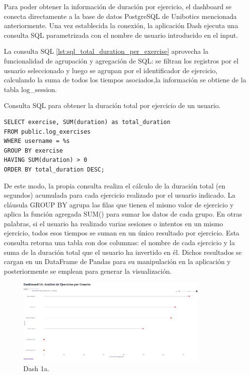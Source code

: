 \documentclass[a4paper, 12pt]{book}
\begin{document}
Para poder obtener la información de duración por ejercicio, el dashboard se conecta directamente a la base de datos PostgreSQL de Unibotics mencionada anteriormente.
Una vez establecida la conexión, la aplicación Dash ejecuta una consulta SQL parametrizada con el nombre de usuario introducido en el input.

La consulta SQL \ref{lst:sql_total_duration_per_exercise} aprovecha la funcionalidad de agrupación y agregación de SQL: se filtran los registros por el usuario seleccionado y luego se agrupan por el identificador de ejercicio, calculando la suma de todos los tiempos asociados,la información se obtiene de la tabla log\_session.

\begin{listing}[h!]
    \caption{Consulta SQL para obtener la duración total por ejercicio de un usuario.}{}
    \label{lst:sql_total_duration_per_exercise}
    \begin{verbatim}
SELECT exercise, SUM(duration) as total_duration
FROM public.log_exercises
WHERE username = %s
GROUP BY exercise
HAVING SUM(duration) > 0  
ORDER BY total_duration DESC;
    \end{verbatim}
\end{listing}


De este modo, la propia consulta realiza el cálculo de la duración total (en segundos) acumulada para cada ejercicio realizado por el usuario indicado. La cláusula GROUP BY agrupa las filas que tienen el mismo valor de ejercicio y aplica la función agregada SUM() para sumar los datos de cada grupo.
En otras palabras, si el usuario ha realizado varias sesiones o intentos en un mismo ejercicio, todos esos tiempos se suman en un único resultado por ejercicio. Esta consulta retorna una tabla con dos columnas: el nombre de cada ejercicio y la suma de la duración total que el usuario ha invertido en él. Dichos resultados se cargan en un DataFrame de Pandas para su manipulación en la aplicación y posteriormente se emplean para generar la visualización.

\begin{figure}
  \centering
  \includegraphics[width=0.85\textwidth, keepaspectratio]{img/1a.png}
  \caption{Dash 1a.}\label{fig:1a}
\end{figure}
\end{document}
